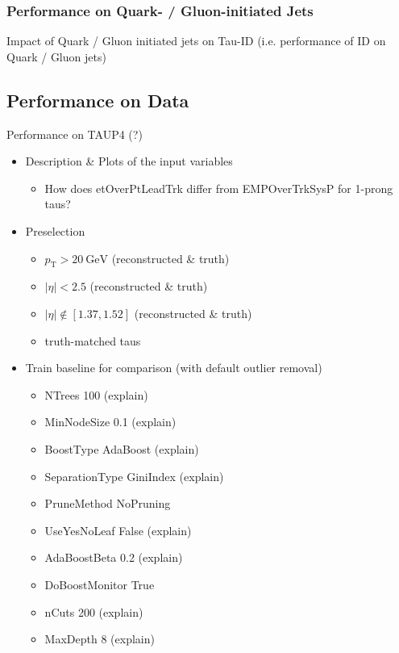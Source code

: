 \subsubsection{Performance on Quark- / Gluon-initiated Jets}
\label{sec:bdt_perf_quark_gluon}

Impact of Quark / Gluon initiated jets on Tau-ID (i.e. performance of ID
on Quark / Gluon jets)

\subsection{Performance on Data}
\label{sec:bdt_perf_data}

Performance on TAUP4 (?)

\begin{itemize}
\item Description \& Plots of the input variables
  \begin{itemize}
  \item How does etOverPtLeadTrk differ from EMPOverTrkSysP for 1-prong taus?
  \end{itemize}

\item Preselection
  \begin{itemize}
  \item $p_\mathrm{T} > \SI{20}{\GeV}$ (reconstructed \& truth)
  \item $| \eta | < 2.5$ (reconstructed \& truth)
  \item $| \eta | \notin \left[ 1.37, 1.52 \right]$ (reconstructed \& truth)
  \item truth-matched taus
  \end{itemize}

\item Train baseline for comparison (with default outlier removal)
  \begin{itemize}
  \item NTrees 100 (explain)
  \item MinNodeSize 0.1 (explain)
  \item BoostType AdaBoost (explain)
  \item SeparationType GiniIndex (explain)
  \item PruneMethod NoPruning
  \item UseYesNoLeaf False (explain)
  \item AdaBoostBeta 0.2 (explain)
  \item DoBoostMonitor True
  \item nCuts 200 (explain)
  \item MaxDepth 8 (explain)
  \end{itemize}


\end{itemize}
